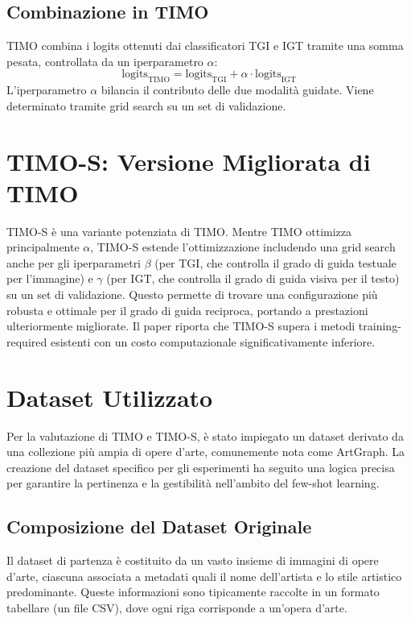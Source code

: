 \documentclass[11pt,a4paper]{article}
\begin{document}
\subsection{Combinazione in TIMO}
TIMO combina i logits ottenuti dai classificatori TGI e IGT tramite una somma pesata, controllata da un iperparametro $\alpha$:
\[ \text{logits}_{\text{TIMO}} = \text{logits}_{\text{TGI}} + \alpha \cdot \text{logits}_{\text{IGT}} \]
L'iperparametro $\alpha$ bilancia il contributo delle due modalità guidate. Viene determinato tramite grid search su un set di validazione.

\section{TIMO-S: Versione Migliorata di TIMO}
TIMO-S è una variante potenziata di TIMO. Mentre TIMO ottimizza principalmente $\alpha$, TIMO-S estende l'ottimizzazione includendo una grid search anche per gli iperparametri $\beta$ (per TGI, che controlla il grado di guida testuale per l'immagine) e $\gamma$ (per IGT, che controlla il grado di guida visiva per il testo) su un set di validazione.
Questo permette di trovare una configurazione più robusta e ottimale per il grado di guida reciproca, portando a prestazioni ulteriormente migliorate. Il paper riporta che TIMO-S supera i metodi training-required esistenti con un costo computazionale significativamente inferiore.



\section{Dataset Utilizzato}
\label{sec:dataset}
Per la valutazione di TIMO e TIMO-S, è stato impiegato un dataset derivato da una collezione più ampia di opere d'arte, comunemente nota come ArtGraph. La creazione del dataset specifico per gli esperimenti ha seguito una logica precisa per garantire la pertinenza e la gestibilità nell'ambito del few-shot learning.

\subsection{Composizione del Dataset Originale}
Il dataset di partenza è costituito da un vasto insieme di immagini di opere d'arte, ciascuna associata a metadati quali il nome dell'artista e lo stile artistico predominante. Queste informazioni sono tipicamente raccolte in un formato tabellare (un file CSV), dove ogni riga corrisponde a un'opera d'arte.
\end{document}
